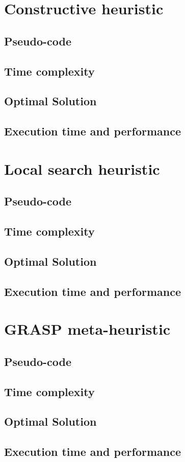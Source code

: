 \documentclass[a4paper, 12pt]{report}
\begin{document}
	\chapter{Constructive heuristic}
		\section{Pseudo-code}
		\section{Time complexity}
		\section{Optimal Solution}
		\section{Execution time and performance}
	
	\chapter{Local search heuristic}
		\section{Pseudo-code}
		\section{Time complexity}
		\section{Optimal Solution}
		\section{Execution time and performance}
	
	\chapter{GRASP meta-heuristic}
		\section{Pseudo-code}
		\section{Time complexity}
		\section{Optimal Solution}
		\section{Execution time and performance}
		
	
	
	
\end{document}
